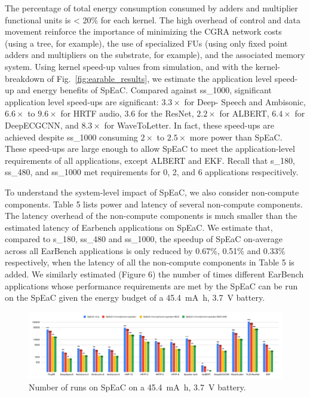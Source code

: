 The percentage of total energy consumption consumed by adders and multiplier
functional units is < 20\% for each kernel. The high overhead of control and
data movement reinforce the importance of minimizing the CGRA network costs
(using a tree, for example), the use of specialized FUs (using only fixed point
adders and multipliers on the substrate, for example), and the associated
memory system. Using kernel speed-up values from simulation, and with the
kernel-breakdown of Fig.~\ref{fig:earable_results}, we estimate the application
level speed-up and energy benefits of SpEaC. Compared against ss\_1000,
significant application level speed-ups are significant: \(3.3\times\) for
Deep- Speech and Ambisonic, \(6.6\times\) to \(9.6\times\) for HRTF audio,
\(3.6\) for the ResNet, \(2.2\times\) for ALBERT, \(6.4\times\) for DeepECGCNN,
and \(8.3\times\) for WaveToLetter. In fact, these speed-ups are achieved
despite ss\_1000 consuming \(2\times\) to \(2.5\times\) more power than SpEaC.
These speed-ups are large enough to allow SpEaC to meet the application-level
requirements of all applications, except ALBERT and EKF. Recall
that s\_180, ss\_480, and ss\_1000 met requirements for 0, 2, and 6 applications
respecitively.

To understand the system-level impact of SpEaC, we also consider non-compute
components. Table 5 lists power and latency of several non-compute components.
The latency overhead of the non-compute components is much smaller than the
estimated latency of Earbench applications on SpEaC. We estimate that, compared
to s\_180, ss\_480 and ss\_1000, the speedup of SpEaC on-average across all
EarBench applications is only reduced by 0.67\%, 0.51\% and 0.33\% respectively,
when the latency of all the non-compute components in Table 5 is added. We
similarly estimated (Figure 6) the number of times different EarBench
applications whose performance requirements are met by the SpEaC can be run on
the SpEaC given the energy budget of a \SI{45.4}{\milli\ampere\hour},
\SI{3.7}{\volt} battery.


\begin{figure}
    \centering
    \includegraphics[width=\linewidth]{./figs/speakandsensors.png}
    \caption{\small
    Number of runs on SpEaC on a \SI{45.4}{\milli\ampere\hour}, \SI{3.7}{\volt}
    battery.
    }
    \label{fig:earable_system}
\end{figure}

